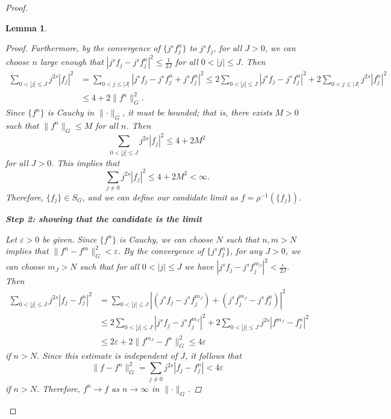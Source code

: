 \documentclass{homework}
\newtheorem{lemma}{Lemma}
\begin{document}
\begin{arabicparts}
\begin{proof}
\begin{lemma}
\begin{proof}
				Furthermore, by the convergence of $\{j^sf^n_j\}$ to $j^sf_j$, for all $J > 0$, we can choose $n$ large enough that $|j^sf_j - j^sf^n_j|^2 \le \frac{1}{2J}$ for all $0 < |j| \le J$. Then
				\begin{align}
					\sum_{0<|j|\le J}j^{2s}|f_j|^2 &= \sum_{0<j\le|J|}|j^sf_j - j^sf^n_j + j^sf^n_j|^2\le 2\sum_{0<|j|\le J} |j^sf_j - j^sf^n_j|^2  +2\sum_{0<j\le|J|}j^{2s}|f^n_j|^2\\
					&\le 4 +2\lVert f^n\rVert_G^2.
				\end{align}
				Since $\{f^n\}$ is Cauchy in $\lVert\cdot\rVert_G$, it must be bounded; that is, there exists $M > 0$ such that $\lVert f^n\rVert_G \le M$ for all $n$. Then
				\begin{equation}
					\sum_{0<|j|\le J}j^{2s}|f_j|^2 \le 4 + 2M^2
				\end{equation}
				for all $J > 0$. This implies that
				\begin{equation}
					\sum_{j\ne 0}j^{2s}|f_j|^2 \le 4 + 2M^2 < \infty.
				\end{equation}
				Therefore, $\{f_j\} \in S_G$, and we can define our candidate limit as $f = \rho^{-1}(\{f_j\})$.
				
				\textbf{Step 2: showing that the candidate is the limit}
				
				Let $\varepsilon > 0$ be given. Since $\{f^n\}$ is Cauchy, we can choose $N$ such that $n,m > N$ implies that $\lVert f^n - f^m\rVert_G^2 < \varepsilon$. By the convergence of $\{j^sf^n_j\}$, for any $J > 0$, we can choose $m_J > N$ such that for all $0 < |j| \le J$ we have $|j^sf_j-j^sf^{m_J}_j|^2 < \frac{\varepsilon}{2J}$. Then
				\newcommand{\lJ}{{0<|j|\le J}}
				\begin{align}
					\sum_\lJ j^{2s}|f_j - f^n_j|^2 &= \sum_\lJ |(j^sf_j - j^sf^{m_J}_j) + (j^sf^{m_J}_j - j^sf^n_j)|^2 \\
					&\le 2\sum_\lJ |j^sf_j - j^sf^{m_J}_j|^2 + 2\sum_\lJ j^{2s}|f^{m_J}-f^n_j|^2\\
					&\le 2\varepsilon + 2\lVert f^{m_J} -f^n\rVert_G^2 \le 4\varepsilon
				\end{align}
				if $n > N$. Since this estimate is independent of $J$, it follows that
				\begin{equation}
					\lVert f - f^n\rVert_G^2 = \sum_{j\ne 0}j^{2s}|f_j-f^n_j| < 4\varepsilon
				\end{equation}			
				if $n > N$. Therefore, $f^n \to f$ as $n\to \infty$ in $\lVert \cdot \rVert_G$.
			\end{proof}
		\end{lemma}
		

\end{proof}
\end{arabicparts}
\end{document}
